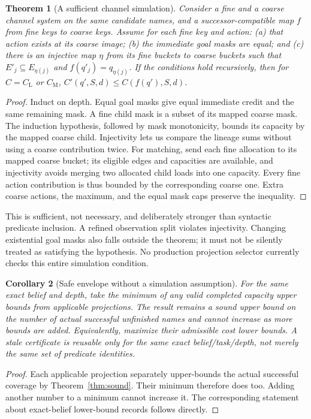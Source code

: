 \documentclass[11pt]{article}
\newtheorem{theorem}{Theorem}[section]
\newtheorem{corollary}[theorem]{Corollary}
\theoremstyle{definition}
\newcommand{\CL}{C_{\mathrm L}}
\newcommand{\CM}{C_{\mathrm M}}
\begin{document}
\begin{theorem}[A sufficient channel simulation]\label{thm:simulation}
Consider a fine and a coarse channel system on the same candidate names, and
a successor-compatible map $f$ from fine keys to coarse keys. Assume for each
fine key and action: (a) that action exists at its coarse image;
(b) the immediate goal masks are equal; and (c) there is an injective map
$\eta$ from its fine buckets to coarse buckets such that
$E'_j\subseteq E_{\eta(j)}$ and $f(q'_j)=q_{\eta(j)}$.
If the conditions hold recursively, then for $C=\CL$ or $\CM$,
$C'(q',S,d)\leq C(f(q'),S,d)$.
\end{theorem}
\begin{proof}
Induct on depth. Equal goal masks give equal immediate credit and the same
remaining mask. A fine child mask is a subset of its mapped coarse mask.
The induction hypothesis, followed by mask monotonicity, bounds its capacity
by the mapped coarse child. Injectivity lets us compare the lineage sums
without using a coarse contribution twice. For matching, send each fine
allocation to its mapped coarse bucket; its eligible edges and capacities are
available, and injectivity avoids merging two allocated child loads into one
capacity. Every fine action contribution is thus bounded by the corresponding
coarse one. Extra coarse actions, the maximum, and the equal mask caps preserve
the inequality.
\end{proof}
This is sufficient, not necessary, and deliberately stronger than syntactic
predicate inclusion. A refined observation split violates injectivity. Changing
existential goal masks also falls outside the theorem; it must not be silently
treated as satisfying the hypothesis. No production projection selector currently
checks this entire simulation condition.

\begin{corollary}[Safe envelope without a simulation assumption]
For the same exact belief and depth, take the minimum of any valid completed
capacity upper bounds from applicable projections. The result remains a sound
upper bound on the number of actual successful unfinished names and cannot
increase as more bounds are added. Equivalently, maximize their admissible
cost lower bounds. A stale certificate is reusable only for the same exact
belief/task/depth, not merely the same set of predicate identities.
\end{corollary}
\begin{proof}
Each applicable projection separately upper-bounds the actual successful
coverage by Theorem~\ref{thm:sound}. Their minimum therefore does too. Adding
another number to a minimum cannot increase it. The corresponding statement
about exact-belief lower-bound records follows directly.
\end{proof}
\end{document}
